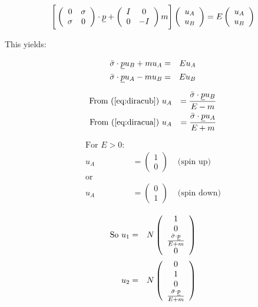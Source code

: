 \[
  \Bigg[
  \left(
    \begin{array}{cc}
    0 & \sigma \\
    \sigma & 0
    \end{array}
  \right)
  \cdot \underline{p}
  +
  \left(
    \begin{array}{cc}
    I & 0 \\
    0 & -I
    \end{array}
  \right)
  m
  \Bigg]
  \left(
    \begin{array}{c}
    u_A \\
    u_B
    \end{array}
  \right)
  = E
  \left(
    \begin{array}{c}
    u_A \\
    u_B
    \end{array}
  \right)
\]

This yields:

\begin{eqnarray}
  \bar{\sigma}\cdot\underline{p} u_B + mu_A & = & Eu_A \label{eq:diracub} \\
  \bar{\sigma}\cdot\underline{p} u_A - mu_B & = & Eu_B \label{eq:diracua}
\end{eqnarray}

\begin{eqnarray*}
  \textrm{From (\ref{eq:diracub}) } & u_A & = \frac{\bar{\sigma}\cdot\underline{p}u_B}{E - m} \\
  \textrm{From (\ref{eq:diracua}) } & u_A & = \frac{\bar{\sigma}\cdot\underline{p}u_A}{E + m}
\end{eqnarray*}

\begin{eqnarray*}
  \textrm{For } E>0: && \\
  u_A & =
  \left(
    \begin{array}{c}
    1 \\
    0
    \end{array}
  \right)
  & \textrm{ (spin up)}
  \\
  \textrm{or} && \\
  u_A & =
  \left(
    \begin{array}{c}
    0 \\
    1
    \end{array}
  \right)
  & \textrm{ (spin down)}
\end{eqnarray*}

\begin{eqnarray*}
  \textrm{So } u_1 & = & N
  \left(
    \begin{array}{c}
    1 \\
    0 \\
    \frac{\bar{\sigma}\cdot\underline{p}}{E + m} \\
    0
    \end{array}
  \right)
  \\
  u_2 & = & N
  \left(
    \begin{array}{c}
    0 \\
    1 \\
    0 \\
    \frac{\bar{\sigma}\cdot\underline{p}}{E + m}
    \end{array}
  \right)
\end{eqnarray*}

